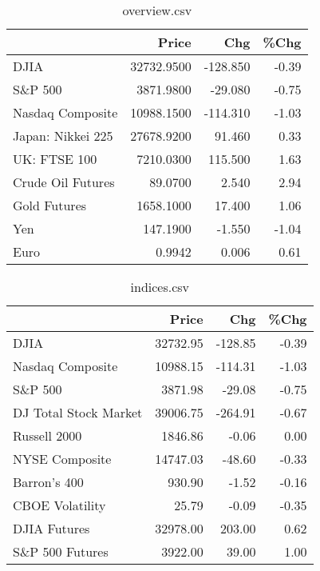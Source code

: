 \documentclass{article}%
\begin{document}
\begin{table}[htbp]%
\caption{overview.csv}%
\centering%
\begin{adjustbox}{width=1\textwidth}%
\begin{tabular}{lrrr}
\toprule
                  &      Price &      Chg &  \%Chg \\
\midrule
             DJIA & 32732.9500 & -128.850 & -0.39 \\
          S\&P 500 &  3871.9800 &  -29.080 & -0.75 \\
 Nasdaq Composite & 10988.1500 & -114.310 & -1.03 \\
Japan: Nikkei 225 & 27678.9200 &   91.460 &  0.33 \\
     UK: FTSE 100 &  7210.0300 &  115.500 &  1.63 \\
Crude Oil Futures &    89.0700 &    2.540 &  2.94 \\
     Gold Futures &  1658.1000 &   17.400 &  1.06 \\
              Yen &   147.1900 &   -1.550 & -1.04 \\
             Euro &     0.9942 &    0.006 &  0.61 \\
\bottomrule
\end{tabular}
%
\end{adjustbox}%
\end{table}

%


\begin{table}[htbp]%
\caption{indices.csv}%
\centering%
\begin{adjustbox}{width=1\textwidth}%
\begin{tabular}{lrrr}
\toprule
                      &    Price &     Chg &  \%Chg \\
\midrule
                 DJIA & 32732.95 & -128.85 & -0.39 \\
     Nasdaq Composite & 10988.15 & -114.31 & -1.03 \\
              S\&P 500 &  3871.98 &  -29.08 & -0.75 \\
DJ Total Stock Market & 39006.75 & -264.91 & -0.67 \\
         Russell 2000 &  1846.86 &   -0.06 &  0.00 \\
       NYSE Composite & 14747.03 &  -48.60 & -0.33 \\
         Barron's 400 &   930.90 &   -1.52 & -0.16 \\
      CBOE Volatility &    25.79 &   -0.09 & -0.35 \\
         DJIA Futures & 32978.00 &  203.00 &  0.62 \\
      S\&P 500 Futures &  3922.00 &   39.00 &  1.00 \\
\bottomrule
\end{tabular}
%
\end{adjustbox}%
\end{table}
\end{document}
